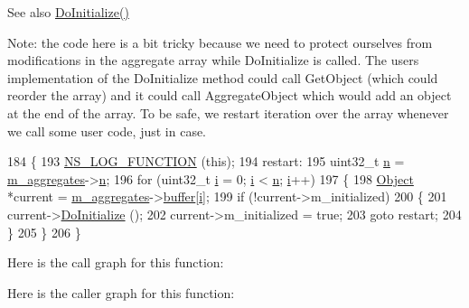 \begin{DoxySeeAlso}{See also}
\hyperlink{classns3_1_1Object_af8482a521433409fb5c7f749398c9dbe}{Do\+Initialize()} 
\end{DoxySeeAlso}
Note\+: the code here is a bit tricky because we need to protect ourselves from modifications in the aggregate array while Do\+Initialize is called. The user\textquotesingle{}s implementation of the Do\+Initialize method could call Get\+Object (which could reorder the array) and it could call Aggregate\+Object which would add an object at the end of the array. To be safe, we restart iteration over the array whenever we call some user code, just in case.
\begin{DoxyCode}
184 \{
193   \hyperlink{log-macros-disabled_8h_a90b90d5bad1f39cb1b64923ea94c0761}{NS\_LOG\_FUNCTION} (\textcolor{keyword}{this});
194 restart:
195   uint32\_t \hyperlink{namespacesample-rng-plot_aeb5ee5c431e338ef39b7ac5431242e1d}{n} = \hyperlink{classns3_1_1Object_a1f0aff511aa8bbed3f3c3dc9b1d41fe4}{m\_aggregates}->\hyperlink{structns3_1_1Object_1_1Aggregates_a3157f15eafcbf5f0ec5c85d390853829}{n};
196   \textcolor{keywordflow}{for} (uint32\_t \hyperlink{bernuolliDistribution_8m_a6f6ccfcf58b31cb6412107d9d5281426}{i} = 0; \hyperlink{bernuolliDistribution_8m_a6f6ccfcf58b31cb6412107d9d5281426}{i} < \hyperlink{namespacesample-rng-plot_aeb5ee5c431e338ef39b7ac5431242e1d}{n}; \hyperlink{bernuolliDistribution_8m_a6f6ccfcf58b31cb6412107d9d5281426}{i}++)
197     \{
198       \hyperlink{classns3_1_1Object_a40860402e64d8008fb42329df7097cdb}{Object} *current = \hyperlink{classns3_1_1Object_a1f0aff511aa8bbed3f3c3dc9b1d41fe4}{m\_aggregates}->\hyperlink{structns3_1_1Object_1_1Aggregates_ad7680c3fcf46fefedf8ef443e64448be}{buffer}[\hyperlink{bernuolliDistribution_8m_a6f6ccfcf58b31cb6412107d9d5281426}{i}];
199       \textcolor{keywordflow}{if} (!current->m\_initialized)
200         \{
201           current->\hyperlink{classns3_1_1Object_af8482a521433409fb5c7f749398c9dbe}{DoInitialize} ();
202           current->m\_initialized = \textcolor{keyword}{true};
203           \textcolor{keywordflow}{goto} restart;
204         \}
205     \}
206 \}
\end{DoxyCode}


Here is the call graph for this function\+:




Here is the caller graph for this function\+:


